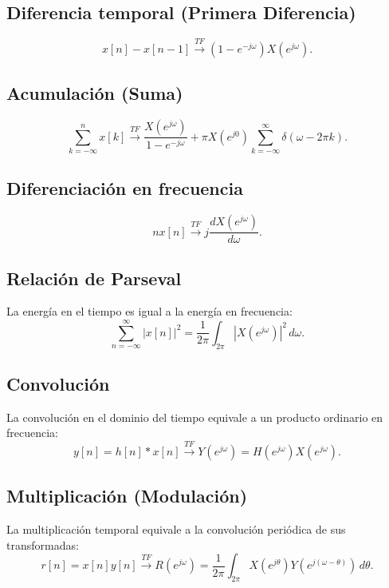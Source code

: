 \subsection{Diferencia temporal (Primera Diferencia)}
\begin{equation}
	x[n] - x[n-1] \xrightarrow{TF} (1 - e^{-j\omega}) X(e^{j\omega}).
\end{equation}

\subsection{Acumulaci\'{o}n (Suma)}
\begin{equation}
	\sum_{k=-\infty}^{n} x[k] \xrightarrow{TF} \frac{X(e^{j\omega})}{1 - e^{-j\omega}} + \pi X(e^{j0}) \sum_{k=-\infty}^{\infty} \delta(\omega - 2\pi k).
\end{equation}

\subsection{Diferenciaci\'{o}n en frecuencia}
\begin{equation}
	n x[n] \xrightarrow{TF} j \frac{d X(e^{j\omega})}{d\omega}.
\end{equation}

\subsection{Relaci\'{o}n de Parseval}
La energía en el tiempo es igual a la energía en frecuencia:
\begin{equation}
	\sum_{n=-\infty}^{\infty} |x[n]|^{2} = \frac{1}{2\pi} \int_{2\pi} |X(e^{j\omega})|^{2} \, d\omega.
\end{equation}

\subsection{Convoluci\'{o}n}
La convolución en el dominio del tiempo equivale a un producto ordinario en frecuencia:
\begin{equation}
	y[n] = h[n] * x[n] \xrightarrow{TF} Y(e^{j\omega}) = H(e^{j\omega}) X(e^{j\omega}).
\end{equation}

\subsection{Multiplicaci\'{o}n (Modulación)}
La multiplicación temporal equivale a la convolución periódica de sus transformadas:
\begin{equation}
	r[n] = x[n] y[n] \xrightarrow{TF} R(e^{j\omega}) = \frac{1}{2\pi} \int_{2\pi} X(e^{j\theta}) Y(e^{j(\omega - \theta)}) \, d\theta.
\end{equation}
